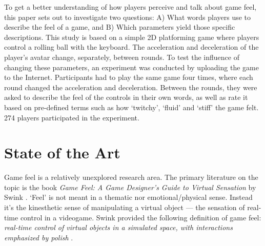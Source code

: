 To get a better understanding of how players perceive and talk about game feel, this paper sets out to investigate two questions: A) What words players use to describe the feel of a game, and B) Which parameters yield those specific descriptions. This study is based on a simple 2D platforming game where players control a rolling ball with the keyboard. The acceleration and deceleration of the player's avatar change, separately, between rounds. To test the influence of changing these parameters, an experiment was conducted by uploading the game to the Internet. Participants had to play the same game four times, where each round changed the acceleration and deceleration. Between the rounds, they were asked to describe the feel of the controls in their own words, as well as rate it based on pre-defined terms such as how `twitchy', `fluid' and `stiff' the game felt. 274 players participated in the experiment.

\section{State of the Art} \label{stateOfTheArt}


Game feel is a relatively unexplored research area. The primary literature on the topic is the book \textit{Game Feel: A Game Designer's Guide to Virtual Sensation} by Swink \cite{swink}. `Feel' is not meant in a thematic nor emotional/physical sense. Instead it's the kinesthetic sense of manipulating a virtual object --- the sensation of real-time control in a videogame. Swink provided the following definition of game feel: \textit{real-time control of virtual objects in a simulated space, with interactions emphasized by polish} \cite{swink}.

